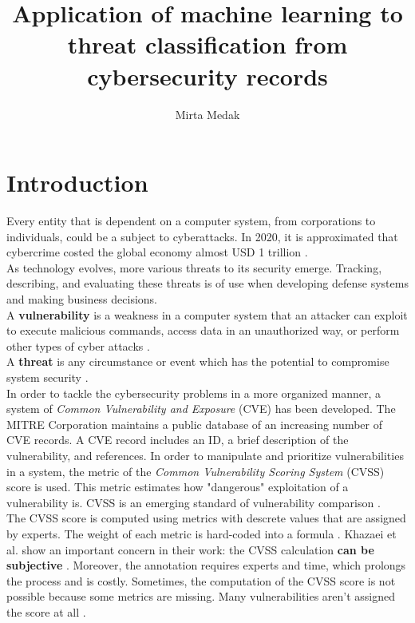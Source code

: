 \documentclass[times, utf8, zavrsni, english]{fer}
\begin{document}


\title{Application of machine learning to threat classification from cybersecurity records}


\author{Mirta Medak}

\maketitle

\zahvala{}

\tableofcontents

\chapter{Introduction}
Every entity that is dependent on a computer system, from corporations to individuals, could be a subject to cyberattacks. In 2020, it is approximated that cybercrime costed the global economy almost USD 1 trillion \citep{cremer}. \\
As technology evolves, more various threats to its security emerge.
Tracking, describing, and evaluating these threats is of use when developing defense systems and making business decisions. \\
A \textbf{vulnerability} is a weakness in a computer system that an attacker can exploit to execute malicious commands, access data in an unauthorized way, or perform other types of cyber attacks \citep{humayun}. \\
A \textbf{threat} is any circumstance or event which has the potential to compromise system security \citep{FER}. \\
In order to tackle the cybersecurity problems in a more organized manner, a system of \emph{Common Vulnerability and Exposure} (CVE) has been developed. The MITRE Corporation maintains a public database of an increasing number of CVE records.
A CVE record includes an ID, a brief description of the vulnerability, and references.
In order to manipulate and prioritize vulnerabilities in a system, the metric of the \emph{Common Vulnerability Scoring System} (CVSS) score is used. This metric estimates how "dangerous" exploitation of a vulnerability is. CVSS is an emerging standard of vulnerability comparison \citep{khazaei}. \\
The CVSS score is computed using metrics with descrete values that are assigned by experts. The weight of each metric is hard-coded into a formula \citep{bozorgi}. Khazaei et al. show an important concern in their work: the CVSS calculation \textbf{can be subjective} \citep{khazaei}.
Moreover, the annotation requires experts and time, which prolongs the process and is costly.
Sometimes, the computation of the CVSS score is not possible because some metrics are missing. Many vulnerabilities aren't assigned the score at all \citep{vulnerwatch}.\\
\end{document}
